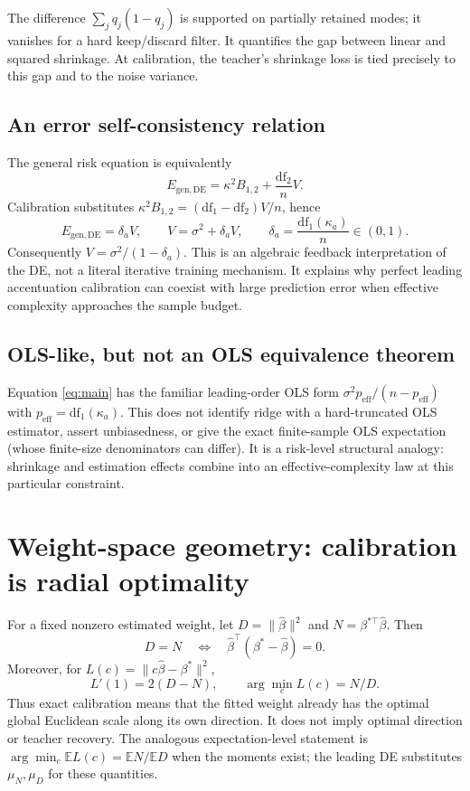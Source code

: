 \documentclass[11pt]{article}
\newcommand{\df}{\mathrm{df}}
\newcommand{\Eg}{E_{\mathrm{gen,DE}}}
\begin{document}
The difference $\sum_jq_j(1-q_j)$ is supported on partially retained modes;
it vanishes for a hard keep/discard filter. It quantifies the gap between
linear and squared shrinkage. At calibration, the teacher's shrinkage loss
is tied precisely to this gap and to the noise variance.

\subsection{An error self-consistency relation}
The general risk equation is equivalently
\[
 \Eg=\kappa^2B_{1,2}+\frac{\df_2}{n}V.
\]
Calibration substitutes
$\kappa^2B_{1,2}=(\df_1-\df_2)V/n$, hence
\begin{equation}
 \Eg=\delta_a V,\qquad V=\sigma^2+\delta_a V,
 \qquad \delta_a=\frac{\df_1(\kappa_a)}n\in(0,1).
\end{equation}
Consequently $V=\sigma^2/(1-\delta_a)$. This is an algebraic feedback
interpretation of the DE, not a literal iterative training mechanism.
It explains why perfect leading accentuation calibration can coexist with
large prediction error when effective complexity approaches the sample budget.

\subsection{OLS-like, but not an OLS equivalence theorem}
Equation \eqref{eq:main} has the familiar leading-order OLS form
$\sigma^2p_{\mathrm{eff}}/(n-p_{\mathrm{eff}})$ with
$p_{\mathrm{eff}}=\df_1(\kappa_a)$. This does not identify ridge with a
hard-truncated OLS estimator, assert unbiasedness, or give the exact
finite-sample OLS expectation (whose finite-size denominators can differ).
It is a risk-level structural analogy: shrinkage and estimation effects
combine into an effective-complexity law at this particular constraint.

\section{Weight-space geometry: calibration is radial optimality}
For a fixed nonzero estimated weight, let
$D=\|\hat\beta\|^2$ and $N=\beta^{*\top}\hat\beta$. Then
\[
 D=N\quad\Longleftrightarrow\quad
 \hat\beta^\top(\beta^*-\hat\beta)=0.
\]
Moreover, for $L(c)=\|c\hat\beta-\beta^*\|^2$,
\[
 L'(1)=2(D-N),\qquad \arg\min_c L(c)=N/D.
\]
Thus exact calibration means that the fitted weight already has the optimal
global Euclidean scale along its own direction. It does not imply optimal
direction or teacher recovery. The analogous expectation-level statement is
$\arg\min_c\mathbb E L(c)=\mathbb E N/\mathbb E D$ when the moments exist;
the leading DE substitutes $\mu_N,\mu_D$ for these quantities.
\end{document}
